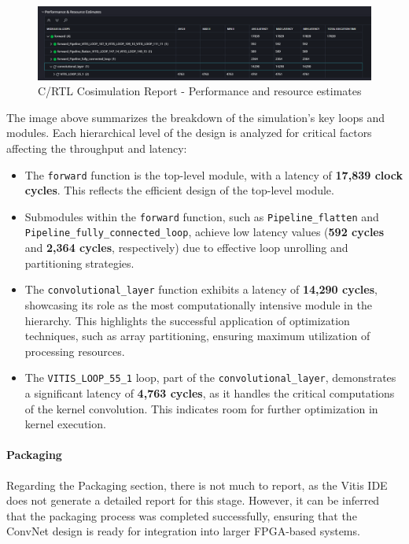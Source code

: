 \documentclass{article}
\begin{document}
\begin{figure}[H]
    \centering
    \includegraphics[width=1\textwidth]{./assets/ConvNet/c-rtl-cosimulation.png}
    \caption{C/RTL Cosimulation Report - Performance and resource estimates}
    \label{fig:C-RTL-cosimulation-convnet}
\end{figure}

The image above summarizes the breakdown of the simulation's key loops and modules. Each hierarchical level of the design is analyzed for critical factors affecting the throughput and latency:

\begin{itemize}
    \item The \texttt{forward} function is the top-level module, with a latency of \textbf{17,839 clock cycles}. This reflects the efficient design of the top-level module.
    \item Submodules within the \texttt{forward} function, such as \texttt{Pipeline\_flatten} and \texttt{Pipeline\_fully\_connected\_loop}, achieve low latency values (\textbf{592 cycles} and \textbf{2,364 cycles}, respectively) due to effective loop unrolling and partitioning strategies.
    \item The \texttt{convolutional\_layer} function exhibits a latency of \textbf{14,290 cycles}, showcasing its role as the most computationally intensive module in the hierarchy. This highlights the successful application of optimization techniques, such as array partitioning, ensuring maximum utilization of processing resources.
    \item The \texttt{VITIS\_LOOP\_55\_1} loop, part of the \texttt{convolutional\_layer}, demonstrates a significant latency of \textbf{4,763 cycles}, as it handles the critical computations of the kernel convolution. This indicates room for further optimization in kernel execution.
\end{itemize}


\paragraph{Packaging}
Regarding the Packaging section, there is not much to report, as the Vitis IDE does not generate a detailed report for this stage. However, it can be inferred that the packaging process was completed successfully, ensuring that the ConvNet design is ready for integration into larger FPGA-based systems.
\end{document}
